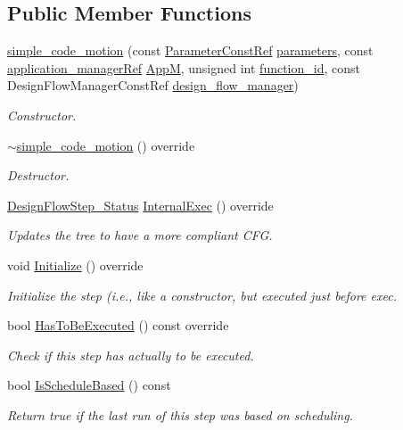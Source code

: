 \subsection*{Public Member Functions}
\begin{DoxyCompactItemize}
\item 
\hyperlink{classsimple__code__motion_ad187a9fcaf94b18b0fa72c8725386d4b}{simple\+\_\+code\+\_\+motion} (const \hyperlink{Parameter_8hpp_a37841774a6fcb479b597fdf8955eb4ea}{Parameter\+Const\+Ref} \hyperlink{classDesignFlowStep_a802eaafe8013df706370679d1a436949}{parameters}, const \hyperlink{application__manager_8hpp_a04ccad4e5ee401e8934306672082c180}{application\+\_\+manager\+Ref} \hyperlink{classFrontendFlowStep_a0ac0d8db2a378416583f51c4faa59d15}{AppM}, unsigned int \hyperlink{classFunctionFrontendFlowStep_a58ef2383ad1a212a8d3f396625a4b616}{function\+\_\+id}, const Design\+Flow\+Manager\+Const\+Ref \hyperlink{classDesignFlowStep_ab770677ddf087613add30024e16a5554}{design\+\_\+flow\+\_\+manager})
\begin{DoxyCompactList}\small\item\em Constructor. \end{DoxyCompactList}\item 
\hyperlink{classsimple__code__motion_abb99083863cc83ac6bc24881a325b4a0}{$\sim$simple\+\_\+code\+\_\+motion} () override
\begin{DoxyCompactList}\small\item\em Destructor. \end{DoxyCompactList}\item 
\hyperlink{design__flow__step_8hpp_afb1f0d73069c26076b8d31dbc8ebecdf}{Design\+Flow\+Step\+\_\+\+Status} \hyperlink{classsimple__code__motion_ada1641b8154a93dd9ea23bb778b8e059}{Internal\+Exec} () override
\begin{DoxyCompactList}\small\item\em Updates the tree to have a more compliant C\+FG. \end{DoxyCompactList}\item 
void \hyperlink{classsimple__code__motion_a786374b9d68aa7b714254c22a1220e6c}{Initialize} () override
\begin{DoxyCompactList}\small\item\em Initialize the step (i.\+e., like a constructor, but executed just before exec. \end{DoxyCompactList}\item 
bool \hyperlink{classsimple__code__motion_a2b0b3e0ac4c9ad745ef690e183358c5f}{Has\+To\+Be\+Executed} () const override
\begin{DoxyCompactList}\small\item\em Check if this step has actually to be executed. \end{DoxyCompactList}\item 
bool \hyperlink{classsimple__code__motion_a4bc8cf1a2064701a32e036c9495477f7}{Is\+Schedule\+Based} () const
\begin{DoxyCompactList}\small\item\em Return true if the last run of this step was based on scheduling. \end{DoxyCompactList}\end{DoxyCompactItemize}
